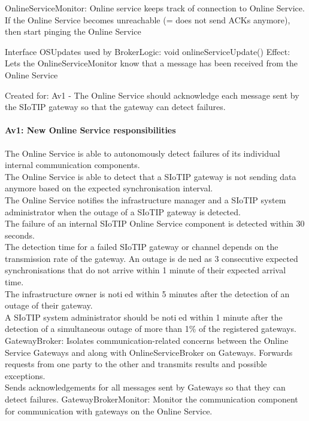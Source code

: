             OnlineServiceMonitor:
                Online service keeps track of connection to Online Service.
                If the Online Service becomes unreachable (= does not send ACKs anymore), then start pinging the Online Service

                Interface OSUpdates used by BrokerLogic:
                    void onlineServiceUpdate()
                        Effect: Lets the OnlineServiceMonitor know that a message has been received from the Online Service
                        \item Created for: Av1 - The Online Service should acknowledge each message sent by the SIoTIP gateway so that the gateway can detect failures.


    \paragraph{Av1: New Online Service responsibilities}
        The Online Service is able to autonomously detect failures of its individual internal communication components.\\
        The Online Service is able to detect that a SIoTIP gateway is not sending data anymore based on the expected synchronisation interval.\\
        The Online Service notifies the infrastructure manager and a SIoTIP system administrator when the outage of a SIoTIP gateway is detected.\\
        The failure of an internal SIoTIP Online Service component is detected within 30 seconds.\\
        The detection time for a failed SIoTIP gateway or channel depends on the transmission rate
        of the gateway. An outage is dened as 3 consecutive expected synchronisations that do not
        arrive within 1 minute of their expected arrival time.\\
        The infrastructure owner is notied within 5 minutes after the detection of an outage of their gateway.\\
        A SIoTIP system administrator should be notied within 1 minute after the detection
        of a simultaneous outage of more than 1\% of the registered gateways.\\

        GatewayBroker: Isolates communication-related concerns between the Online Service Gateways and along with OnlineServiceBroker on Gateways.
                       Forwards requests from one party to the other and transmits results and possible exceptions. \\
                       Sends acknowledgements for all messages sent by Gateways so that they can detect failures.
        GatewayBrokerMonitor: Monitor the communication component for communication with gateways on the Online Service.

